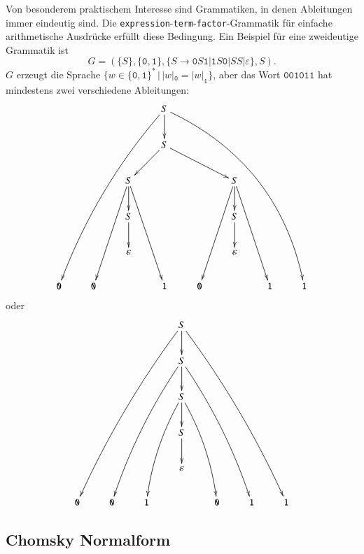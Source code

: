 Von besonderem praktischem Interesse sind Grammatiken, in denen
Ableitungen immer eindeutig sind. Die
%
{\tt expression}-{\tt term}-{\tt factor}-Grammatik für einfache
arithmetische Ausdrücke erfüllt diese Bedingung. 
Ein Beispiel für eine zweideutige Grammatik ist
\[
G=(\{S\}, \{\texttt{0},\texttt{1}\}, \{S\to \texttt{0}S\texttt{1}|\texttt{1}S\texttt{0}|SS|\varepsilon\}, S).
\]
$G$ erzeugt die Sprache
$\{w\in \{\texttt{0},\texttt{1}\}^*\,|\, |w|_{\texttt{0}} = |w|_\texttt{1}\}$, aber das Wort
$\texttt{001011}$ hat mindestens zwei verschiedene Ableitungen:
\[
\xymatrix{
&&&S\ar@/_10pt/[dddddlll]\ar[d]\ar@/^30pt/[dddddrrrr]
\\
&&&S\ar[dl]\ar[drr]
\\
 &&S\ar[dddl]\ar[d]\ar[dddr]&&&S\ar[dddl]\ar[d]\ar[dddr]&&
\\
&&S\ar[d]&&&S\ar[d]&&
\\
 & &\varepsilon& & &\varepsilon& & 
\\
\texttt{0}&\texttt{0}& &\texttt{1}&\texttt{0}& &\texttt{1}&\texttt{1}
}
\]
oder
\[
\xymatrix{
&&&S\ar@/_/[dddddlll]\ar[d]\ar@/^/[dddddrrr]
\\
&&&S\ar@/_/[ddddll]\ar[d]\ar@/^/[ddddrr]&&&
\\
&&&S\ar@/_/[dddl]\ar[d]\ar@/^/[dddr]&&&
\\
&&&S\ar[d]&&&
\\
&&&\varepsilon&&&
\\
\texttt{0}&\texttt{0}&\texttt{1}&&\texttt{0}&\texttt{1}&\texttt{1}
}
\]


\subsection{Chomsky Normalform}


